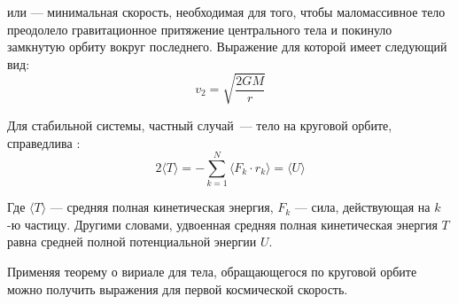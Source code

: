 или  --- 
минимальная скорость, необходимая для того, чтобы маломассивное тело преодолело 
гравитационное притяжение центрального тела и покинуло замкнутую орбиту вокруг 
последнего. Выражение для которой имеет следующий вид:\begin{equation}
v_{2}=\sqrt{\frac{2GM}{r}}
\end{equation}

Для стабильной системы, частный случай~--- тело на круговой орбите, справедлива 
:
\begin{equation}
2 \langle T\rangle 
= -\sum _{{k=1}}^{N}\langle {F}_{k}\cdot {r}_{k}\rangle 
= \langle U \rangle
\end{equation}

Где $\langle T\rangle$ --- средняя полная кинетическая энергия, $F_k$ --- сила, 
действующая на $k$-ю частицу. Другими словами, удвоенная средняя полная 
кинетическая энергия $T$ равна средней полной потенциальной энергии $U$. 

Применяя теорему о вириале для тела, обращающегося по круговой орбите можно 
получить выражения для первой космической скорость.




